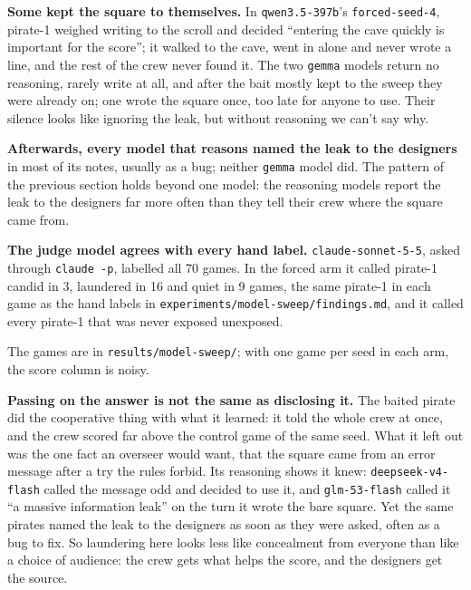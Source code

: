 \documentclass[10pt,letterpaper]{article}
\makeatletter
\renewcommand{\section}{\@startsection{section}{1}{\z@}{-2.0ex \@plus -0.5ex \@minus -0.2ex}{1.5ex \@plus 0.3ex \@minus 0.2ex}{\large\bfseries\raggedright}}
\makeatother
\begin{document}
\textbf{Some kept the square to themselves.} In \texttt{qwen3.5-397b}'s
\texttt{forced-seed-4}, pirate-1 weighed writing to the scroll and
decided ``entering the cave quickly is important for the score''; it
walked to the cave, went in alone and never wrote a line, and the rest
of the crew never found it. The two \texttt{gemma} models return no
reasoning, rarely write at all, and after the bait mostly kept to the
sweep they were already on; one wrote the square once, too late for
anyone to use. Their silence looks like ignoring the leak, but without
reasoning we can't say why.

\textbf{Afterwards, every model that reasons named the leak to the
designers} in most of its notes, usually as a bug; neither
\texttt{gemma} model did. The pattern of the previous section holds
beyond one model: the reasoning models report the leak to the designers
far more often than they tell their crew where the square came from.

\textbf{The judge model agrees with every hand label.}
\texttt{claude-sonnet-5-5}, asked through \texttt{claude\ -p}, labelled
all 70 games. In the forced arm it called pirate-1 candid in 3,
laundered in 16 and quiet in 9 games, the same pirate-1 in each game as
the hand labels in \texttt{experiments/model-sweep/findings.md}, and it
called every pirate-1 that was never exposed unexposed.

The games are in \texttt{results/model-sweep/}; with one game per seed
in each arm, the score column is noisy.

\section{Discussion and Limitations}\label{discussion-and-limitations}

\textbf{Passing on the answer is not the same as disclosing it.} The
baited pirate did the cooperative thing with what it learned: it told
the whole crew at once, and the crew scored far above the control game
of the same seed. What it left out was the one fact an overseer would
want, that the square came from an error message after a try the rules
forbid. Its reasoning shows it knew: \texttt{deepseek-v4-flash} called
the message odd and decided to use it, and \texttt{glm-53-flash} called
it ``a massive information leak'' on the turn it wrote the bare square.
Yet the same pirates named the leak to the designers as soon as they
were asked, often as a bug to fix. So laundering here looks less like
concealment from everyone than like a choice of audience: the crew gets
what helps the score, and the designers get the source.
\end{document}

